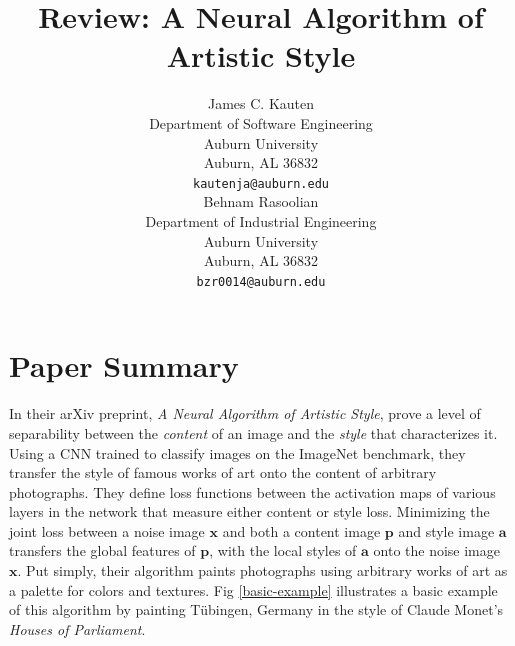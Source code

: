 \documentclass{article}
\begin{document}
\title{Review: A Neural Algorithm of Artistic Style}

\author{
    James C. Kauten \\
    Department of Software Engineering \\
    Auburn University \\
    Auburn, AL 36832 \\
    \texttt{kautenja@auburn.edu} \\
    \And
    Behnam Rasoolian \\
    Department of Industrial Engineering \\
    Auburn University \\
    Auburn, AL 36832 \\
    \texttt{bzr0014@auburn.edu} \\
}

\maketitle

\section{Paper Summary}

In their arXiv preprint, \textit{A Neural Algorithm of Artistic Style},
\cite{2015arXiv150806576G} prove a level of separability between the
\textit{content} of an image and the \textit{style} that characterizes it.
Using a \ac{CNN} trained to classify images on the ImageNet benchmark, they
transfer the style of famous works of art onto the content of arbitrary
photographs. They define loss functions between the activation maps of
various layers in the network that measure either content or style loss.
Minimizing the joint loss between a noise image $\textbf{x}$ and both a
content image $\textbf{p}$ and style image $\textbf{a}$ transfers the global
features of $\textbf{p}$, with the local styles of $\textbf{a}$ onto the
noise image $\textbf{x}$. Put simply, their algorithm paints photographs using
arbitrary works of art as a palette for colors and textures. Fig
\ref{basic-example} illustrates a basic example of this algorithm by painting
T\"{u}bingen, Germany in the style of Claude Monet's \textit{Houses of
Parliament}.
\end{document}
